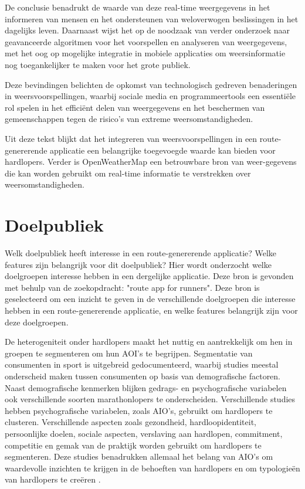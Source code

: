     De conclusie benadrukt de waarde van deze real-time weergegevens in het informeren van mensen en het ondersteunen van weloverwogen beslissingen in het dagelijks leven. 
    Daarnaast wijst het op de noodzaak van verder onderzoek naar geavanceerde algoritmen voor het voorspellen en analyseren van weergegevens, 
    met het oog op mogelijke integratie in mobiele applicaties om weersinformatie nog toegankelijker te maken voor het grote publiek.

    Deze bevindingen belichten de opkomst van technologisch gedreven benaderingen in weersvoorspellingen, waarbij sociale media en programmeertools een essentiële rol spelen 
    in het efficiënt delen van weergegevens en het beschermen van gemeenschappen tegen de risico's van extreme weersomstandigheden.
    \autocite{dewi2019}

    Uit deze tekst blijkt dat het integreren van weersvoorspellingen in een route-genererende applicatie een belangrijke toegevoegde waarde kan bieden voor hardlopers. 
    Verder is OpenWeatherMap een betrouwbare bron van weer-gegevens die kan worden gebruikt om real-time informatie te verstrekken over weersomstandigheden.


    \section{Doelpubliek}

    Welk doelpubliek heeft interesse in een route-genererende applicatie? Welke features zijn belangrijk voor dit doelpubliek?
    Hier wordt onderzocht welke doelgroepen interesse hebben in een dergelijke applicatie.
    Deze bron is gevonden met behulp van de zoekopdracht: "route app for runners". 
    Deze bron is geselecteerd om een inzicht te geven in de verschillende doelgroepen die interesse hebben in een route-genererende applicatie, 
    en welke features belangrijk zijn voor deze doelgroepen.


    De heterogeniteit onder hardlopers maakt het nuttig en aantrekkelijk om hen in groepen te segmenteren om hun AOI's te begrijpen. 
    Segmentatie van consumenten in sport is uitgebreid gedocumenteerd, waarbij studies meestal onderscheid maken tussen consumenten 
    op basis van demografische factoren. Naast demografische kenmerken blijken gedrags- en psychografische variabelen ook 
    verschillende soorten marathonlopers te onderscheiden. Verschillende studies hebben psychografische variabelen, zoals AIO's, 
    gebruikt om hardlopers te clusteren. Verschillende aspecten zoals gezondheid, hardloopidentiteit, persoonlijke doelen, sociale aspecten, 
    verslaving aan hardlopen, commitment, competitie en gemak van de praktijk worden gebruikt om hardlopers te segmenteren.
    Deze studies benadrukken allemaal het belang van AIO's om waardevolle inzichten te krijgen in de behoeften van hardlopers 
    en om typologieën van hardlopers te creëren \textcite{Janssen2020}. 



